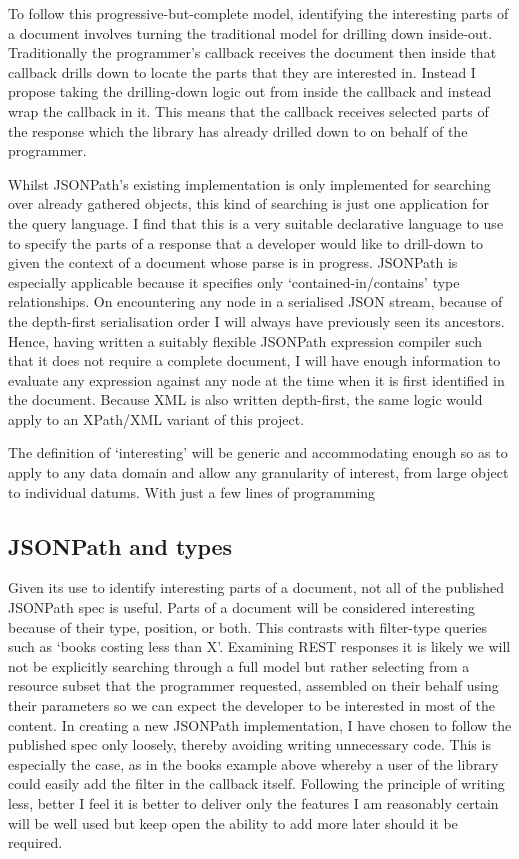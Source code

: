 \documentclass[]{article}
\begin{document}
To follow this progressive-but-complete model, identifying the
interesting parts of a document involves turning the traditional model
for drilling down inside-out. Traditionally the programmer's callback
receives the document then inside that callback drills down to locate
the parts that they are interested in. Instead I propose taking the
drilling-down logic out from inside the callback and instead wrap the
callback in it. This means that the callback receives selected parts of
the response which the library has already drilled down to on behalf of
the programmer.

Whilst JSONPath's existing implementation is only implemented for
searching over already gathered objects, this kind of searching is just
one application for the query language. I find that this is a very
suitable declarative language to use to specify the parts of a response
that a developer would like to drill-down to given the context of a
document whose parse is in progress. JSONPath is especially applicable
because it specifies only `contained-in/contains' type relationships. On
encountering any node in a serialised JSON stream, because of the
depth-first serialisation order I will always have previously seen its
ancestors. Hence, having written a suitably flexible JSONPath expression
compiler such that it does not require a complete document, I will have
enough information to evaluate any expression against any node at the
time when it is first identified in the document. Because XML is also
written depth-first, the same logic would apply to an XPath/XML variant
of this project.

The definition of `interesting' will be generic and accommodating enough
so as to apply to any data domain and allow any granularity of interest,
from large object to individual datums. With just a few lines of
programming

\subsection{JSONPath and types}

Given its use to identify interesting parts of a document, not all of
the published JSONPath spec is useful. Parts of a document will be
considered interesting because of their type, position, or both. This
contrasts with filter-type queries such as `books costing less than X'.
Examining REST responses it is likely we will not be explicitly
searching through a full model but rather selecting from a resource
subset that the programmer requested, assembled on their behalf using
their parameters so we can expect the developer to be interested in most
of the content. In creating a new JSONPath implementation, I have chosen
to follow the published spec only loosely, thereby avoiding writing
unnecessary code. This is especially the case, as in the books example
above whereby a user of the library could easily add the filter in the
callback itself. Following the principle of writing less, better I feel
it is better to deliver only the features I am reasonably certain will
be well used but keep open the ability to add more later should it be
required.
\end{document}
